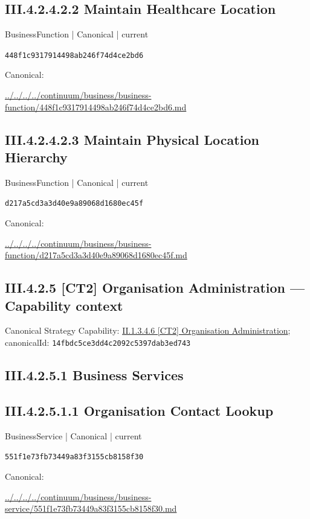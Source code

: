 \documentclass[10pt,a4paper]{article}
\begin{document}
\subsection*{III.4.2.4.2.2 Maintain Healthcare Location}
\label{element-448f1c9317914498ab246f74d4ce2bd6}
{\small BusinessFunction | Canonical | current}\par
\texttt{448f1c9317914498ab246f74d4ce2bd6}\par
Canonical: \par
{\footnotesize\url{../../../../continuum/business/business-function/448f1c9317914498ab246f74d4ce2bd6.md}}\par
\subsection*{III.4.2.4.2.3 Maintain Physical Location Hierarchy}
\label{element-d217a5cd3a3d40e9a89068d1680ec45f}
{\small BusinessFunction | Canonical | current}\par
\texttt{d217a5cd3a3d40e9a89068d1680ec45f}\par
Canonical: \par
{\footnotesize\url{../../../../continuum/business/business-function/d217a5cd3a3d40e9a89068d1680ec45f.md}}\par
\subsection*{III.4.2.5 [CT2] Organisation Administration — Capability context}
Canonical Strategy Capability: \hyperref[element-14fbdc5ce3dd4c2092c5397dab3ed743]{II.1.3.4.6 [CT2] Organisation Administration}; canonicalId: \texttt{14fbdc5ce3dd4c2092c5397dab3ed743}\par
\subsection*{III.4.2.5.1 Business Services}
\subsection*{III.4.2.5.1.1 Organisation Contact Lookup}
\label{element-551f1e73fb73449a83f3155cb8158f30}
{\small BusinessService | Canonical | current}\par
\texttt{551f1e73fb73449a83f3155cb8158f30}\par
Canonical: \par
{\footnotesize\url{../../../../continuum/business/business-service/551f1e73fb73449a83f3155cb8158f30.md}}\par
\end{document}
